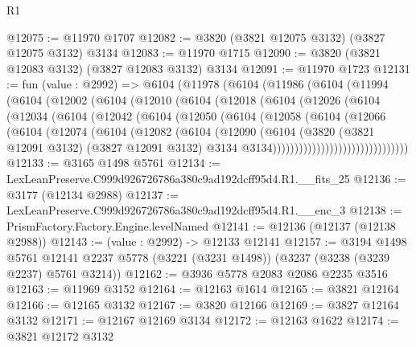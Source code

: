 \begin{lexlean}{R1}
\begin{coremodule}
@12075 := @11970 @1707
@12082 := @3820 (@3821 @12075 @3132) (@3827 @12075 @3132) @3134
@12083 := @11970 @1715
@12090 := @3820 (@3821 @12083 @3132) (@3827 @12083 @3132) @3134
@12091 := @11970 @1723
@12131 := fun (value : @2992) =>
  @6104
    (@11978
      (@6104
        (@11986
          (@6104
            (@11994
              (@6104
                (@12002
                  (@6104
                    (@12010
                      (@6104
                        (@12018
                          (@6104
                            (@12026
                              (@6104
                                (@12034
                                  (@6104
                                    (@12042
                                      (@6104
                                        (@12050
                                          (@6104
                                            (@12058
                                              (@6104
                                                (@12066
                                                  (@6104
                                                    (@12074
                                                      (@6104
                                                        (@12082
                                                          (@6104
                                                            (@12090
                                                              (@6104
                                                                (@3820
                                                                  (@3821 @12091 @3132)
                                                                  (@3827 @12091 @3132)
                                                                  @3134
                                                                  @3134)))))))))))))))))))))))))))))))
@12133 := @3165 @1498 @5761
@12134 := LexLeanPreserve.C999d926726786a380c9ad192dcff95d4.R1.__fits_25
@12136 := @3177 (@12134 @2988)
@12137 := LexLeanPreserve.C999d926726786a380c9ad192dcff95d4.R1.__enc_3
@12138 := PrismFactory.Factory.Engine.levelNamed
@12141 := @12136 (@12137 (@12138 @2988))
@12143 := (value : @2992) -> @12133 @12141
@12157 := @3194
    @1498
    @5761
    @12141
    @2237
    @5778
    (@3221 (@3231 @1498))
    (@3237 (@3238 (@3239 @2237) @5761 @3214))
@12162 := @3936 @5778 @2083 @2086 @2235 @3516
@12163 := @11969 @3152
@12164 := @12163 @1614
@12165 := @3821 @12164
@12166 := @12165 @3132
@12167 := @3820 @12166
@12169 := @3827 @12164 @3132
@12171 := @12167 @12169 @3134
@12172 := @12163 @1622
@12174 := @3821 @12172 @3132

\end{coremodule}
\end{lexlean}
